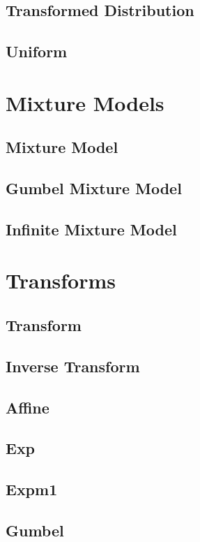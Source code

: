 \documentclass{article}
\begin{document}
\subsection{Transformed Distribution}
\subsection{Uniform}

\section{Mixture Models}
\subsection{Mixture Model}
\subsection{Gumbel Mixture Model}
\subsection{Infinite Mixture Model}

\section{Transforms}
\subsection{Transform}
\subsection{Inverse Transform}
\subsection{Affine}
\subsection{Exp}
\subsection{Expm1}
\subsection{Gumbel}
\end{document}
